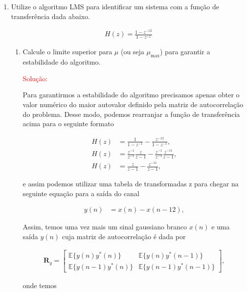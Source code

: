 \documentclass[a4paper,10pt]{article}
\begin{document}
\begin{enumerate}
			\item Utilize o algoritmo LMS para identiﬁcar um sistema com a função de transferência dada abaixo.
			
				\begin{align}
					H(z) = \frac{1 - z^{-12}}{1 - z^{-1}}
				\end{align}
			
				\begin{enumerate}
					
					\item Calcule o limite superior para $\mu$ (ou seja $\mu_{\text{max}}$) para garantir a estabilidade do algoritmo.
					
						\textcolor{red}{Solução:}
					
						Para garantirmos a estabilidade do algoritmo precisamos apenas obter o valor numérico do maior autovalor definido pela matriz de autocorrelação do problema.
						Desse modo, podemos rearranjar a função de transferência acima para o seguinte formato

						\begin{align}
							H(z) &= \frac{1}{1 - z^{-1}} - \frac{z^{-12}}{1 - z^{-1}}, \\
							H(z) &= \frac{z^{-1}}{z^{-1}} \frac{z}{z - 1} - \frac{z^{-1}}{z^{-1}}\frac{z^{-11}}{z - 1}, \\
							H(z) &= \frac{z}{z - 1} - \frac{z^{-11}}{z - 1},
						\end{align}

						e assim podemos utilizar uma tabela de transformadas z para chegar na seguinte equação para a saída do canal

						\begin{align}
							y(n) &= x(n) - x(n - 12), 
						\end{align}

						Assim, temos uma vez mais um sinal gaussiano branco $x(n)$ e uma saída $y(n)$ cuja matriz de autocorrelação é dada por

						\begin{align}
							\mathbf{R}_{y} =
							\begin{bmatrix}
								\mathbb{E}\{y(n) y^{*}(n)\} & \mathbb{E}\{y(n) y^{*}(n - 1)\} \\
								\mathbb{E}\{y(n - 1) y^{*}(n)\}  & \mathbb{E}\{y(n - 1) y^{*}(n - 1)\} 
							\end{bmatrix},
						\end{align}

						onde temos


\end{enumerate}
\end{enumerate}
\end{document}
